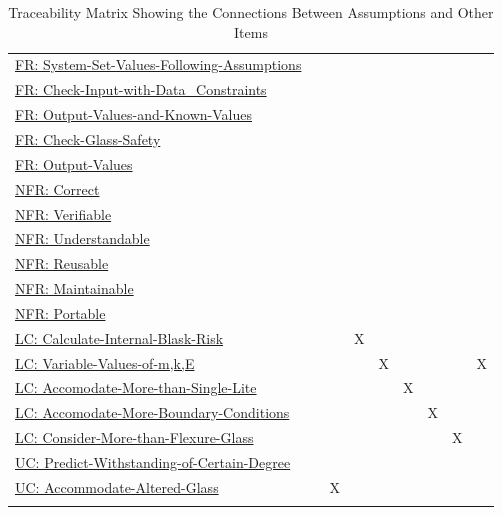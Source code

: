 \documentclass[12pt]{article}
\begin{document}
\begin{longtable}{l l l l l l l l l}
\\
\hyperref[sysSetValsFollowingAssumps]{FR: System-Set-Values-Following-Assumptions} &  &  &  &  &  &  &  & 
\\
\hyperref[checkInputWithDataCons]{FR: Check-Input-with-Data\_Constraints} &  &  &  &  &  &  &  & 
\\
\hyperref[outputValsAndKnownValues]{FR: Output-Values-and-Known-Values} &  &  &  &  &  &  &  & 
\\
\hyperref[checkGlassSafety]{FR: Check-Glass-Safety} &  &  &  &  &  &  &  & 
\\
\hyperref[outputValues]{FR: Output-Values} &  &  &  &  &  &  &  & 
\\
\hyperref[correct]{NFR: Correct} &  &  &  &  &  &  &  & 
\\
\hyperref[verifiable]{NFR: Verifiable} &  &  &  &  &  &  &  & 
\\
\hyperref[understandable]{NFR: Understandable} &  &  &  &  &  &  &  & 
\\
\hyperref[reusable]{NFR: Reusable} &  &  &  &  &  &  &  & 
\\
\hyperref[maintainable]{NFR: Maintainable} &  &  &  &  &  &  &  & 
\\
\hyperref[portable]{NFR: Portable} &  &  &  &  &  &  &  & 
\\
\hyperref[calcInternalBlastRisk]{LC: Calculate-Internal-Blask-Risk} &  &  & X &  &  &  &  & 
\\
\hyperref[varValsOfmkE]{LC: Variable-Values-of-m,k,E} &  &  &  & X &  &  &  & X
\\
\hyperref[accMoreThanSingleLite]{LC: Accomodate-More-than-Single-Lite} &  &  &  &  & X &  &  & 
\\
\hyperref[accMoreBoundaryConditions]{LC: Accomodate-More-Boundary-Conditions} &  &  &  &  &  & X &  & 
\\
\hyperref[considerMoreThanFlexGlass]{LC: Consider-More-than-Flexure-Glass} &  &  &  &  &  &  & X & 
\\
\hyperref[predictWithstandOfCertDeg]{UC: Predict-Withstanding-of-Certain-Degree} &  &  &  &  &  &  &  & 
\\
\hyperref[accAlteredGlass]{UC: Accommodate-Altered-Glass} &  & X &  &  &  &  &  & 
\\
\bottomrule
\caption{Traceability Matrix Showing the Connections Between Assumptions and Other Items}
\label{Table:TraceMatAvsAll}
\end{longtable}
\end{document}
